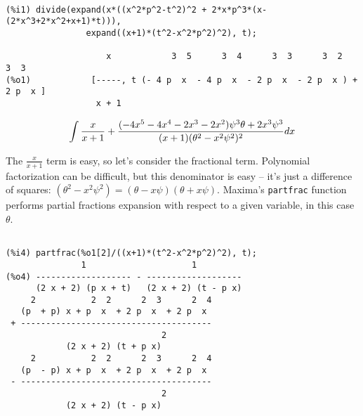 {\small\begin{verbatim}

(%i1) divide(expand(x*((x^2*p^2-t^2)^2 + 2*x*p^3*(x-(2*x^3+2*x^2+x+1)*t))),
                expand((x+1)*(t^2-x^2*p^2)^2), t);

                    x            3  5      3  4      3  3      3  2       3  3
(%o1)            [-----, t (- 4 p  x  - 4 p  x  - 2 p  x  - 2 p  x ) + 2 p  x ]
                  x + 1

\end{verbatim}}


$$\int {x\over{x+1}} + {{(-4x^5-4x^4-2x^3-2x^2)\psi^3\theta + {2x^3}\psi^3}\over{(x+1)(\theta^2 - x^2\psi^2)^2}} dx$$


The $\frac{x}{x+1}$ term is easy, so let's consider the fractional
term.  Polynomial factorization can be difficult, but this denominator
is easy -- it's just a difference of squares: $(\theta^2 - x^2\psi^2) = (\theta-x\psi)(\theta+x\psi)$.
Maxima's {\tt partfrac} function performs partial fractions
expansion with respect to a given variable, in this case $\theta$.


\vfill\eject

{\small\begin{verbatim}

(%i4) partfrac(%o1[2]/((x+1)*(t^2-x^2*p^2)^2), t);
               1                     1
(%o4) ------------------- - -------------------
      (2 x + 2) (p x + t)   (2 x + 2) (t - p x)
     2           2  2      2  3      2  4
   (p  + p) x + p  x  + 2 p  x  + 2 p  x
 + --------------------------------------
                               2
            (2 x + 2) (t + p x)
     2           2  2      2  3      2  4
   (p  - p) x + p  x  + 2 p  x  + 2 p  x
 - --------------------------------------
                               2
            (2 x + 2) (t - p x)
\end{verbatim}}

\begin{comment}
\begin{multline*}
\int {x\over{x+1}} + \frac{(2x^4+2x^3+x^2+x)\psi^2 + x \psi}{2(x+1)(\theta + x \psi)^2}
       + \frac{1}{2(x+1)(\theta + x \psi)} \\
       - \frac{(2x^4+2x^3+x^2+x)\psi^2 - x \psi}{2(x+1)(\theta - x \psi)^2}
       - \frac{1}{2(x+1)(\theta - x \psi)} dx$$
\end{multline*}
\end{comment}

